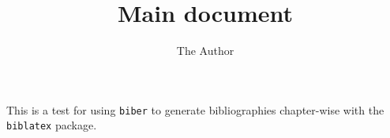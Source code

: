 \documentclass{report}
\begin{document}
\title{Main document}
\author{The Author}
\maketitle

This is a test for using \verb|biber| to generate
bibliographies chapter-wise with the \verb|biblatex| package.


\end{document}
